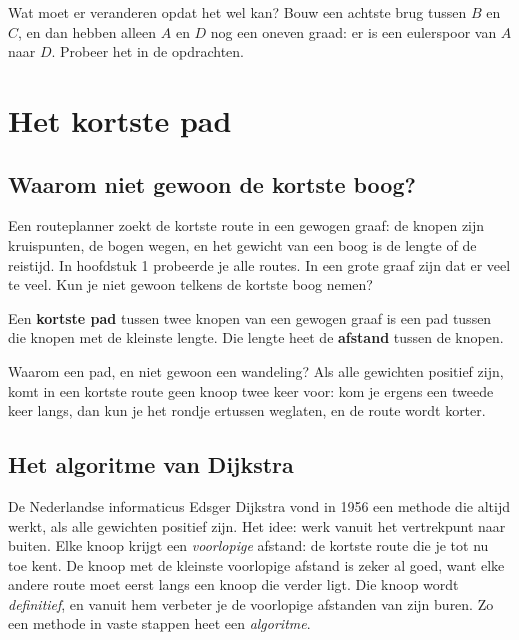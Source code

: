Wat moet er veranderen opdat het wel kan? Bouw een achtste brug tussen $B$ en $C$, en dan hebben alleen $A$ en $D$ nog een oneven graad: er is een eulerspoor van $A$ naar $D$. Probeer het in de opdrachten.

\section{Het kortste pad}

\subsection{Waarom niet gewoon de kortste boog?}

Een routeplanner zoekt de kortste route in een gewogen graaf: de knopen zijn kruispunten, de bogen wegen, en het gewicht van een boog is de lengte of de reistijd. In hoofdstuk 1 probeerde je alle routes. In een grote graaf zijn dat er veel te veel. Kun je niet gewoon telkens de kortste boog nemen?


\begin{theorie}
Een \textbf{\textcolor{accent}{kortste pad}} tussen twee knopen van een gewogen graaf is een pad tussen die knopen met de kleinste lengte. Die lengte heet de \textbf{\textcolor{accent}{afstand}} tussen de knopen.
\end{theorie}

Waarom een pad, en niet gewoon een wandeling? Als alle gewichten positief zijn, komt in een kortste route geen knoop twee keer voor: kom je ergens een tweede keer langs, dan kun je het rondje ertussen weglaten, en de route wordt korter.

\subsection{Het algoritme van Dijkstra}

De Nederlandse informaticus Edsger Dijkstra vond in 1956 een methode die altijd werkt, als alle gewichten positief zijn. Het idee: werk vanuit het vertrekpunt naar buiten. Elke knoop krijgt een \textit{voorlopige} afstand: de kortste route die je tot nu toe kent. De knoop met de kleinste voorlopige afstand is zeker al goed, want elke andere route moet eerst langs een knoop die verder ligt. Die knoop wordt \textit{definitief}, en vanuit hem verbeter je de voorlopige afstanden van zijn buren. Zo een methode in vaste stappen heet een \textit{algoritme}.

